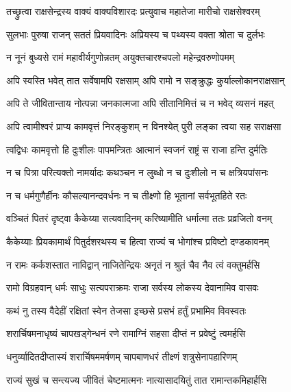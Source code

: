 
\twolineshloka
{तच्छ्रुत्वा राक्षसेन्द्रस्य वाक्यं वाक्यविशारदः}
{प्रत्युवाच महातेजा मारीचो राक्षसेश्वरम्} %

\twolineshloka
{सुलभाः पुरुषा राजन् सततं प्रियवादिनः}
{अप्रियस्य च पथ्यस्य वक्ता श्रोता च दुर्लभः} %

\twolineshloka
{न नूनं बुध्यसे रामं महावीर्यगुणोन्नतम्}
{अयुक्तचारश्चपलो महेन्द्रवरुणोपमम्} %

\twolineshloka
{अपि स्वस्ति भवेत् तात सर्वेषामपि रक्षसाम्}
{अपि रामो न सङ्क्रुद्धः कुर्याल्लोकानराक्षसान्} %

\twolineshloka
{अपि ते जीवितान्ताय नोत्पन्ना जनकात्मजा}
{अपि सीतानिमित्तं च न भवेद् व्यसनं महत्} %

\twolineshloka
{अपि त्वामीश्वरं प्राप्य कामवृत्तं निरङ्कुशम्}
{न विनश्येत् पुरी लङ्का त्वया सह सराक्षसा} %

\twolineshloka
{त्वद्विधः कामवृत्तो हि दुःशीलः पापमन्त्रितः}
{आत्मानं स्वजनं राष्ट्रं स राजा हन्ति दुर्मतिः} %

\twolineshloka
{न च पित्रा परित्यक्तो नामर्यादः कथञ्चन}
{न लुब्धो न च दुःशीलो न च क्षत्रियपांसनः} %

\twolineshloka
{न च धर्मगुणैर्हीनः कौसल्यानन्दवर्धनः}
{न च तीक्ष्णो हि भूतानां सर्वभूतहिते रतः} %

\twolineshloka
{वञ्चितं पितरं दृष्ट्वा कैकेय्या सत्यवादिनम्}
{करिष्यामीति धर्मात्मा ततः प्रव्रजितो वनम्} %

\twolineshloka
{कैकेय्याः प्रियकामार्थं पितुर्दशरथस्य च}
{हित्वा राज्यं च भोगांश्च प्रविष्टो दण्डकावनम्} %

\twolineshloka
{न रामः कर्कशस्तात नाविद्वान् नाजितेन्द्रियः}
{अनृतं न श्रुतं चैव नैव त्वं वक्तुमर्हसि} %

\twolineshloka
{रामो विग्रहवान् धर्मः साधुः सत्यपराक्रमः}
{राजा सर्वस्य लोकस्य देवानामिव वासवः} %

\twolineshloka
{कथं नु तस्य वैदेहीं रक्षितां स्वेन तेजसा}
{इच्छसे प्रसभं हर्तुं प्रभामिव विवस्वतः} %

\twolineshloka
{शरार्चिषमनाधृष्यं चापखड्गेन्धनं रणे}
{रामाग्निं सहसा दीप्तं न प्रवेष्टुं त्वमर्हसि} %

\twolineshloka
{धनुर्व्यादितदीप्तास्यं शरार्चिषममर्षणम्}
{चापबाणधरं तीक्ष्णं शत्रुसेनापहारिणम्} %

\twolineshloka
{राज्यं सुखं च सन्त्यज्य जीवितं चेष्टमात्मनः}
{नात्यासादयितुं तात रामान्तकमिहार्हसि} %

